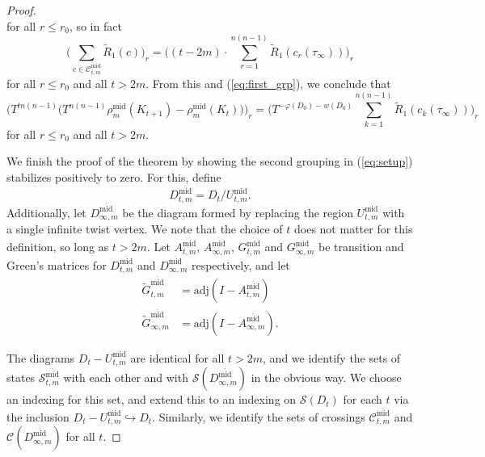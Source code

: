 \documentclass[10pt,a4paper]{amsart}
\begin{document}
\begin{proof}
$$		$$
		for all $r\leq r_0$, so in fact
		$$
		\big( \sum_{c \in \mathcal{C}_{t,m}^\text{mid}} \tilde{R}_1(c) \big)_r = \big((t - 2m) \cdot \sum_{r = 1}^{n(n-1)} \widetilde{R}_1(c_r(\tau_\infty)) \big)_r
		$$
		for all $r \leq r_0$ and all $t > 2m$. From this and (\ref{eq:first_grp}), we conclude that
		\begin{equation}
			\label{eq:plugin}
			\Big( T^{tn(n - 1)} \big(T^{n(n - 1)} \rho^\text{mid}_m(K_{t + 1}) -  \rho^\text{mid}_m(K_t)\big) \Big)_r = \Big(T^{-\varphi(D_0) -w(D_0)} \sum_{k = 1}^{n(n-1)} \widetilde{R}_1(c_k(\tau_\infty)) \Big)_r
		\end{equation}
		for all $r \leq r_0$ and all $t > 2m$.
		
		We finish the proof of the theorem by showing the second grouping in (\ref{eq:setup}) stabilizes positively to zero. For this, define
		$$
		D^{\overline{\text{mid}}}_{t,m} = D_t/U^\text{mid}_{t,m}.
		$$
		Additionally, let $D^{\overline{\text{mid}}}_{\infty,m}$ be the diagram formed by replacing the region $U^\text{mid}_{t,m}$ with a single infinite twist vertex. We note that the choice of $t$ does not matter for this definition, so long as $t > 2m$. Let $A^{\overline{\text{mid}}}_{t,m}$, $A^{\overline{\text{mid}}}_{\infty,m}$, $G^{\overline{\text{mid}}}_{t,m}$ and $G^{\overline{\text{mid}}}_{\infty,m}$ be transition and Green's matrices for $D^{\overline{\text{mid}}}_{t,m}$ and $D^{\overline{\text{mid}}}_{\infty,m}$ respectively, and let
		\begin{align*}
		\widetilde{G}^{\overline{\text{mid}}}_{t,m} &= \text{adj}(I - A^{\overline{\text{mid}}}_{t,m}) \\
		\widetilde{G}^{\overline{\text{mid}}}_{\infty,m} &= \text{adj}(I - A^{\overline{\text{mid}}}_{\infty,m}).
		\end{align*}
	
		The diagrams $D_t - U^\text{mid}_{t,m}$ are identical for all $t > 2m$, and we identify the sets of states $\mathcal{S}_{t,m}^{\overline{\text{mid}}}$ with each other and with $\mathcal{S}(D^{\overline{\text{mid}}}_{\infty,m})$ in the obvious way. We choose an indexing for this set, and extend this to an indexing on $\mathcal{S}(D_t)$ for each $t$ via the inclusion $D_t - U^\text{mid}_{t,m} \hookrightarrow D_t$. Similarly, we identify the sets of crossings $\mathcal{C}^{\overline{\text{mid}}}_{t,m}$ and $\mathcal{C}(D^{\overline{\text{mid}}}_{\infty,m})$ for all $t$.
		

\end{proof}
\end{document}
